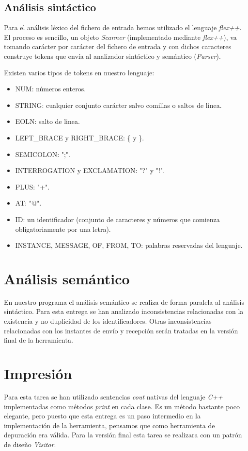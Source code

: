 \documentclass{article}
\begin{document}
\subsection{Análisis sintáctico}

Para el análisis léxico del fichero de entrada hemos utilizado el lenguaje \textit{flex++}. El proceso es sencillo, un objeto \textit{Scanner} (implementado mediante \textit{flex++}), va tomando carácter por carácter del fichero de entrada y con dichos caracteres construye tokens que envía al analizador sintáctico y semántico (\textit{Parser}). 

Existen varios tipos de tokens en nuestro lenguaje:

\begin{itemize}
\item NUM: números enteros.
\item STRING: cualquier conjunto carácter salvo comillas o saltos de linea.
\item EOLN: salto de linea.
\item LEFT\_BRACE y RIGHT\_BRACE: \{ y \}.
\item SEMICOLON: ";".
\item INTERROGATION y EXCLAMATION: "?" y "!".
\item PLUS: "+".
\item AT: "@".
\item ID: un identificador (conjunto de caracteres y números que comienza obligatoriamente por una letra).
\item INSTANCE, MESSAGE, OF, FROM, TO: palabras reservadas del lenguaje.
\end{itemize}

\section{Análisis semántico}

En nuestro programa el análisis semántico se realiza de forma paralela al análisis sintáctico. Para esta entrega se han analizado inconsistencias relacionadas con la existencia y no duplicidad de los identificadores. Otras inconsistencias relacionadas con los instantes de envío y recepción serán tratadas en la versión final de la herramienta. 

\section{Impresión}

Para esta tarea se han utilizado sentencias \textit{cout} nativas del lenguaje \textit{C++} implementadas como métodos \textit{print} en cada clase. Es un método bastante poco elegante, pero puesto que esta entrega es un paso intermedio en la implementación de la herramienta, pensamos que como herramienta de depuración era válida. Para la versión final esta tarea se realizara con un patrón de diseño \textit{Visitor}.
\end{document}
